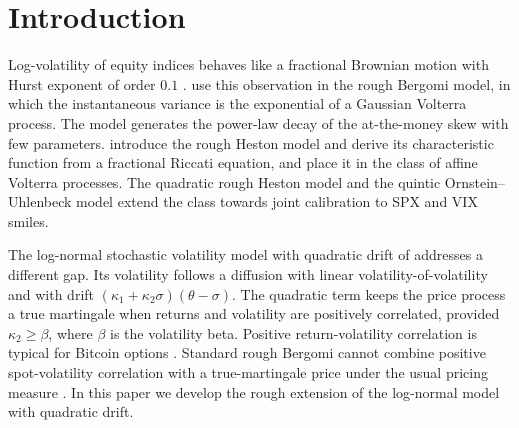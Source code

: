 \section{Introduction}\label{sec:intro}

Log-volatility of equity indices behaves like a fractional Brownian motion with Hurst exponent of order $0.1$ \citep{GatheralJaissonRosenbaum2018}. \citet{BayerFrizGatheral2016} use this observation in the rough Bergomi model, in which the instantaneous variance is the exponential of a Gaussian Volterra process. The model generates the power-law decay of the at-the-money skew with few parameters. \citet{ElEuchRosenbaum2019} introduce the rough Heston model and derive its characteristic function from a fractional Riccati equation, and \citet{AbiJaberLarssonPulido2019} place it in the class of affine Volterra processes. The quadratic rough Heston model \citep{GatheralJusselinRosenbaum2020} and the quintic Ornstein--Uhlenbeck model \citep{AbiJaberIllandLi2022} extend the class towards joint calibration to SPX and VIX smiles.

The log-normal stochastic volatility model with quadratic drift of \citet{SeppRakhmonov2023} addresses a different gap. Its volatility follows a diffusion with linear volatility-of-volatility and with drift $(\kappa_1+\kappa_2\sigma)(\theta-\sigma)$. The quadratic term keeps the price process a true martingale when returns and volatility are positively correlated, provided $\kappa_2\ge\beta$, where $\beta$ is the volatility beta. Positive return-volatility correlation is typical for Bitcoin options \citep{SeppRakhmonov2023}. Standard rough Bergomi cannot combine positive spot-volatility correlation with a true-martingale price under the usual pricing measure \citep{Gassiat2019}. In this paper we develop the rough extension of the log-normal model with quadratic drift.


